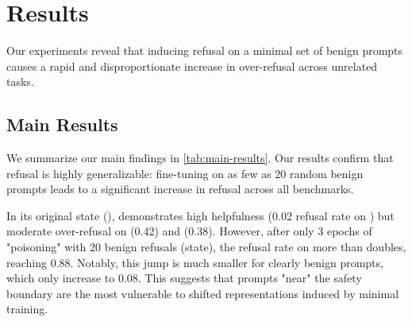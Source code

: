 \section{Results}\label{sec:results}

Our experiments reveal that inducing refusal on a minimal set of benign prompts causes a rapid and disproportionate increase in over-refusal across unrelated tasks.

\subsection{Main Results}

We summarize our main findings in \cref{tab:main-results}. Our results confirm that refusal is highly generalizable: fine-tuning on as few as 20 random benign prompts leads to a significant increase in refusal across all benchmarks.

\begin{table}[t]
\centering
\caption{Refusal rates of \qwen across different benchmarks and training states. The \sensitized state (3 epochs) shows a massive increase in over-refusal benchmarks (\xstest, \orbenchhard) while mostly preserving helpfulness on benign \alpaca prompts. The \collapsed state (10 epochs) indicates a total breakdown of helpfulness.}
\label{tab:main-results}
\end{table}

 In its original state (\baseline), \qwen demonstrates high helpfulness (0.02 refusal rate on \alpaca) but moderate over-refusal on \xstest (0.42) and \orbenchhard (0.38). However, after only 3 epochs of "poisoning" with 20 benign refusals (\sensitized state), the refusal rate on \orbenchhard more than doubles, reaching 0.88. Notably, this jump is much smaller for clearly benign prompts, which only increase to 0.08. This suggests that prompts "near" the safety boundary are the most vulnerable to shifted representations induced by minimal training.

